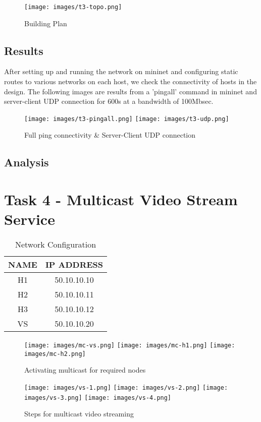 \documentclass{article}
\begin{document}
    \begin{figure}[h]
        \centering
        \texttt{[image: images/t3-topo.png]}
        \caption{Building Plan}
        \label{fig:floor-plan}
    \end{figure}
    \newpage
    \subsection{Results}
        After setting up and running the network on mininet and configuring static routes to various networks on each host, we check the connectivity of hosts in the design. The following images are results from a 'pingall' command in mininet and server-client UDP connection for 600s at a bandwidth of 100Mbsec.
        \begin{figure}[h]
            \centering
            \texttt{[image: images/t3-pingall.png]}
            \texttt{[image: images/t3-udp.png]}
            \caption{Full ping connectivity \& Server-Client UDP connection}
            \label{fig:task3}
        \end{figure}
    \subsection{Analysis}

\newpage
\section{Task 4 - Multicast Video Stream Service}
    \begin{table}[h]
        \centering
        \begin{tabular}{|c|c|}
            \hline
            NAME & IP ADDRESS \\
            \hline
            H1 & 50.10.10.10 \\
            H2 & 50.10.10.11 \\
            H3 & 50.10.10.12 \\
            VS & 50.10.10.20 \\
            \hline
        \end{tabular}
        \caption{Network Configuration}
        \label{tab:node-info}
    \end{table}
    \begin{figure}[h]
        \centering
        \texttt{[image: images/mc-vs.png]}
        \texttt{[image: images/mc-h1.png]}
        \texttt{[image: images/mc-h2.png]}
        \caption{Activating multicast for required nodes}
        \label{fig:activate multicast}
    \end{figure}
    \begin{figure}[h]
        \texttt{[image: images/vs-1.png]}
        \texttt{[image: images/vs-2.png]}
        \texttt{[image: images/vs-3.png]}
        \texttt{[image: images/vs-4.png]}
        \caption{Steps for multicast video streaming}
        \label{fig:enter-label}
    \end{figure}
    \newpage
    
\end{document}
